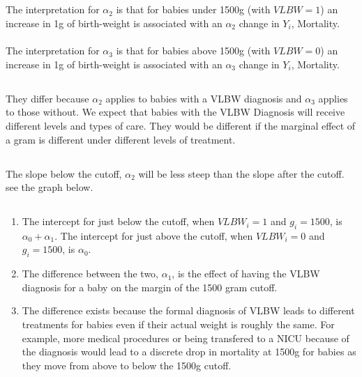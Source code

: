 \documentclass[11pt]{article}
\begin{document}
\subsection{}
The interpretation for $\alpha_2$ is that for babies under 1500g (with $VLBW = 1$) an increase in 1g of birth-weight is associated with an $\alpha_2$ change in $Y_i$, Mortality. 
\\
\\
The interpretation for $\alpha_3$ is that for babies above 1500g (with $VLBW = 0$) an increase in 1g of birth-weight is associated with an $\alpha_3$ change in $Y_i$, Mortality.

\subsection{}

They differ because $\alpha_2$ applies to babies with a VLBW diagnosis and $\alpha_3$ applies to those without. We expect that babies with the VLBW Diagnosis will receive different levels and types of care. They would be different if the marginal effect of a gram is different under different levels of treatment.  

\subsection{}

The slope below the cutoff, $\alpha_2$ will be less steep than the slope after the cutoff. 
see the graph below. \\
\newpage


\subsection{}
  \renewcommand{\theenumi}{\roman{enumi}}
\begin{enumerate}
	\item The intercept for just below the cutoff, when $VLBW_i = 1$ and $g_i = 1500$, is $\alpha_0 + \alpha_1$. The intercept for just above the cutoff, when $VLBW_i = 0$ and $g_i = 1500$, is $\alpha_0$. 
	 
	 \item The difference between the two, $\alpha_1$, is the effect of having the VLBW diagnosis for a baby on the margin of the 1500 gram cutoff. 
	 
	 \item The difference exists because the formal diagnosis of VLBW leads to different treatments for babies even if their actual weight is roughly the same. For example, more medical procedures or being transfered to a NICU because of the diagnosis would lead to a discrete drop in mortality at 1500g for babies as they move from above to below the 1500g cutoff. 
\end{enumerate}
\end{document}
